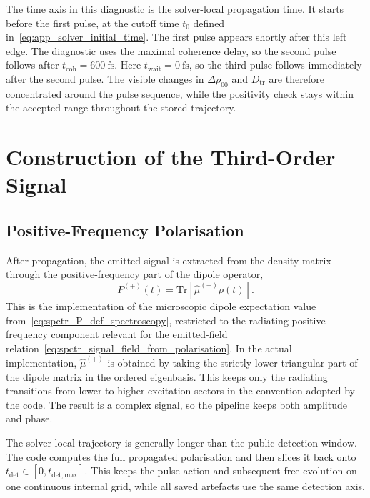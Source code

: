 The time axis in this diagnostic is the solver-local propagation time. It
starts before the first pulse, at the cutoff time \(t_0\) defined
in~\autoref{eq:app_solver_initial_time}. The
first pulse appears shortly after this left edge. The diagnostic uses the
maximal coherence delay, so the second pulse follows after
\(t_{\mathrm{coh}}=\SI{600}{\femto\second}\). Here
\(t_{\mathrm{wait}}=\SI{0}{\femto\second}\), so the third pulse follows
immediately after the second pulse. The visible changes in
\(\Delta\rho_{00}\) and \(D_{\mathrm{tr}}\) are therefore concentrated around
the pulse sequence, while the positivity check stays within the accepted
range throughout the stored trajectory.

\section{Construction of the Third-Order Signal}
\label{app:sec:third_order_polarisation}

\subsection{Positive-Frequency Polarisation}

After propagation, the emitted signal is extracted from the density matrix through the positive-frequency part of the dipole operator,
\begin{equation*}
P^{(+)}(t) = \mathrm{Tr}\!\left[\hat{\mu}^{(+)}\rho(t)\right].
\end{equation*}
This is the implementation of the microscopic dipole expectation value from~\autoref{eq:spctr_P_def_spectroscopy}, restricted to the radiating positive-frequency component relevant for the emitted-field relation~\autoref{eq:spctr_signal_field_from_polarisation}.
In the actual implementation, $\hat{\mu}^{(+)}$ is obtained by taking the strictly lower-triangular part of the dipole matrix in the ordered eigenbasis. This keeps only the radiating transitions from lower to higher excitation sectors in the convention adopted by the code. The result is a complex signal, so the pipeline keeps both amplitude and phase.

The solver-local trajectory is generally longer than the public detection window. The code computes the full propagated polarisation and then slices it back onto \(t_{\mathrm{det}} \in [0,t_{\mathrm{det,max}}]\). This keeps the pulse action and subsequent free evolution on one continuous internal grid, while all saved artefacts use the same detection axis.

